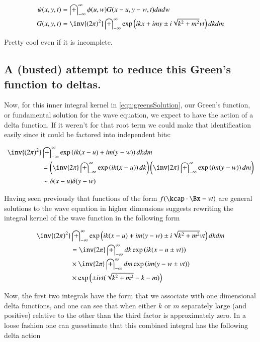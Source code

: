 \documentclass{article}
\newcommand{\IIinf}[0]{ \int_{-\infty}^\infty }
\begin{document}
\begin{align}\label{eqn:greensSolution}
{\psi}(x,y,t) &= \IIinf \phi(u,w) G( x-u, y-w, t) du dw \\
G(x,y,t) &= \inv{({2\pi})^2} \IIinf \exp\left( i k x + i m y \pm i \sqrt{k^2 + m^2} v t \right) dk dm
\end{align}

Pretty cool even if it is incomplete.

\subsection{ A (busted) attempt to reduce this Green's function to deltas. }

Now, for this inner integral kernel in \ref{eqn:greensSolution}, our Green's function, or fundamental solution for the wave equation,
we expect to have the action of a delta function.  If it weren't for that root term we could make that
identification easily since it could be factored into independent bits:

\begin{align*}
\inv{({2\pi})^2} &\IIinf \exp\left( i k (x-u) + i m (y-w) \right) dk dm  \\
&=
\left(\inv{{2\pi}} \IIinf \exp\left( i k (x-u) \right) dk \right)
\left(\inv{{2\pi}} \IIinf \exp\left( i m (y-w) \right) dm \right) \\
&\sim \delta( x - u)\delta( y - w)
\end{align*}

Having seen previously that functions of the form $f(\kcap \cdot \Bx -v t)$ are general solutions to the wave equation in higher 
dimensions suggests rewriting the integral kernel of the wave function in the following form

\begin{align*}
\inv{({2\pi})^2} &\IIinf \exp\left( i k (x-u) + i m (y-w) \pm i \sqrt{k^2 + m^2} v t \right) dk dm \\
&=
\inv{{2\pi}} \IIinf dk \exp\left( i k (x - u \pm v t) \right) \\
&\times \inv{{2\pi}} \IIinf dm \exp\left( i m (y - w \pm v t) \right) \\
&\times \exp\left( \pm i v t ( \sqrt{k^2 + m^2} -k - m ) \right) \\
\end{align*}

Now, the first two integrals have the form that we associate with one dimensional delta functions, and one can see that when either 
$k$ or $m$ separately large (and positive) relative to the other than the third factor is approximately zero.  In a loose fashion one
can guesstimate that this combined integral has the following delta action
\end{document}
